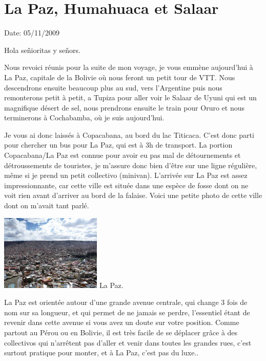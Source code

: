 \section{La Paz, Humahuaca et Salaar}

Date: 05/11/2009

\begin{multicols}{2}

Hola señioritas y señors.

Nous revoici réunis pour la suite de mon voyage, je vous emmène aujourd'hui à La Paz, capitale de la Bolivie où nous feront un petit tour de VTT. Nous descendrons ensuite beaucoup plus au sud, vers l'Argentine puis nous remonterons petit à petit, a Tupiza pour aller voir le Salaar de Uyuni qui est un magnifique désert de sel, nous prendrons ensuite le train pour Oruro et nous terminerons à Cochabamba, où je suis aujourd'hui.

Je vous ai donc laissés à Copacabana, au bord du lac Titicaca. C'est donc parti pour chercher un bus pour La Paz, qui est à 3h de transport. La portion Copacabana/La Paz est connue pour avoir eu pas mal de détournements et détroussements de touristes, je m'assure donc bien d'être sur une ligne régulière, même si je prend un petit collectivo (minivan). L'arrivée sur La Paz est assez impressionnante, car cette ville est située dans une espèce de fosse dont on ne voit rien avant d'arriver au bord de la falaise. Voici une petite photo de cette ville dont on m'avait tant parlé.

\hspace*{-0.65cm}
\includegraphics[width=4.8cm]{articles/La-paz-humahuaca-et-salaar/1257387232lefu.jpg}
La Paz.

La Paz est orientée autour d'une grande avenue centrale, qui change 3 fois de nom sur sa longueur, et qui permet de ne jamais se perdre, l'essentiel étant de revenir dans cette avenue si vous avez un doute sur votre position. Comme partout au Pérou ou en Bolivie, il est très facile de se déplacer grâce à des collectivos qui n'arrêtent pas d'aller et venir dans toutes les grandes rues, c'est surtout pratique pour monter, et à La Paz, c'est pas du luxe..


\end{multicols}
